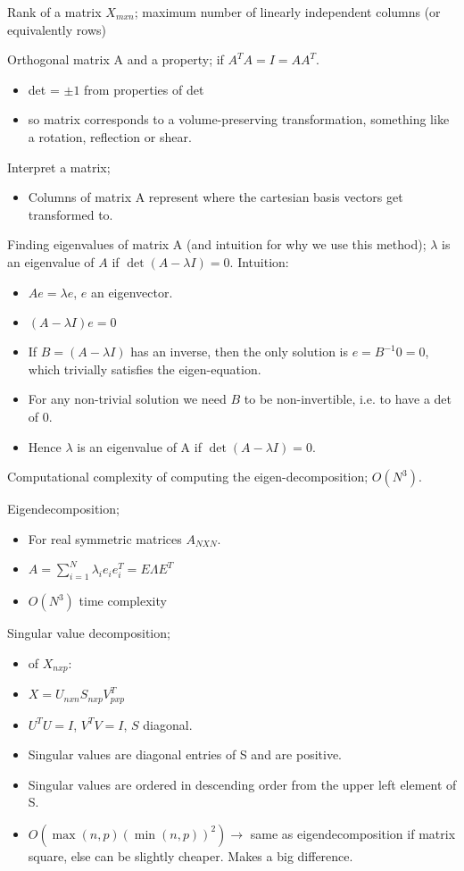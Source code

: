 \documentclass{article}
\begin{document}
Rank of a matrix $X_{mxn}$; maximum number of linearly independent columns (or equivalently rows)

Orthogonal matrix A and a property; if $A^TA=I=AA^T$. \begin{itemize} \item det = $\pm 1$ from properties of det \item so matrix corresponds to a volume-preserving transformation, something like a rotation, reflection or shear. \end{itemize}
	
Interpret a matrix; \begin{itemize} \item Columns of matrix A represent where the cartesian basis vectors get transformed to. \end{itemize}

Finding eigenvalues of matrix A (and intuition for why we use this method); $\lambda$ is an eigenvalue of $A$ if $\det(A-\lambda I) = 0$. Intuition: \begin{itemize} \item $Ae=\lambda e$, $e$ an eigenvector. \item $(A-\lambda I)e=0$ \item If $B=(A-\lambda I)$ has an inverse, then the only solution is $e=B^{-1}0 = 0$, which trivially satisfies the eigen-equation. \item For any non-trivial solution we need $B$ to be non-invertible, i.e. to have a det of 0. \item Hence $\lambda$ is an eigenvalue of A if $\det(A-\lambda I) = 0$. \end{itemize}

Computational complexity of computing the eigen-decomposition; $O(N^3)$.

Eigendecomposition; \begin{itemize} \item For real symmetric matrices $A_{NXN}$. \item $A = \sum_{i=1}^N \lambda_i e_i e_i^T = E\Lambda E^T$ \item $O(N^3)$ time complexity \end{itemize}

Singular value decomposition; \begin{itemize} \item of $X_{nxp}$:  \item $X = U_{nxn}S_{nxp}V^T_{pxp}$ \item $U^TU=I$, $V^TV=I$, $S$ diagonal. \item Singular values are diagonal entries of S and are positive.  \item Singular values are ordered in descending order from the upper left element of S. \item $O(\max(n,p)(\min(n,p))^2) \rightarrow$ same as eigendecomposition if matrix square, else can be slightly cheaper. Makes a big difference. \end{itemize}
\end{document}
